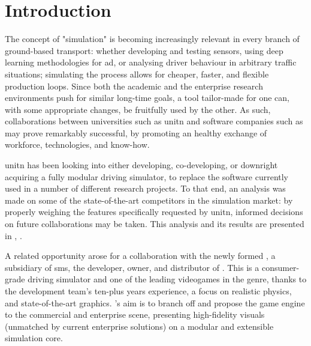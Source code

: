 \chapter*{Introduction}\label{ch:introduction}

The concept of "simulation" is becoming increasingly relevant in every branch of ground-based transport: whether developing and testing sensors, using deep learning methodologies for \gls{ad}, or analysing driver behaviour in arbitrary traffic situations; simulating the process allows for cheaper, faster, and flexible production loops. Since both the academic and the enterprise research environments push for similar long-time goals, a tool tailor-made for one can, with some appropriate changes, be fruitfully used by the other. As such, collaborations between universities such as \gls{unitn} and software companies such as  may prove remarkably successful, by promoting an healthy exchange of workforce, technologies, and know-how.

\gls{unitn} has been looking into either developing, co-developing, or downright acquiring a fully modular driving simulator, to replace the software currently used in a number of different research projects. To that end, an analysis was made on some of the state-of-the-art competitors in the simulation market: by properly weighing the \glspl{feature} specifically requested by \gls{unitn}, informed decisions on future collaborations may be taken. This analysis and its results are presented in , .

A related opportunity arose for a collaboration with the newly formed , a subsidiary of \gls{sms}, the developer, owner, and distributor of . This is a consumer-grade driving simulator and one of the leading videogames in the genre, thanks to the development team's ten-plus years experience, a focus on realistic physics, and state-of-the-art graphics. 's aim is to branch off and propose the game engine to the commercial and enterprise scene, presenting high-fidelity visuals (unmatched by current enterprise solutions) on a modular and extensible simulation core.

